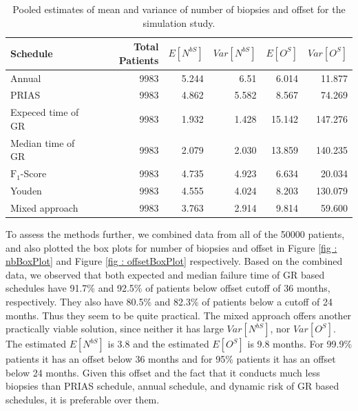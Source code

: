 \begin{table}[!htb]
\centering
\captionsetup{justification=centering}
\caption{Pooled estimates of mean and variance of number of biopsies and offset for the simulation study.}
\label{table : sim_study_pooled_estimates}
\begin{tabular}{@{}lrrrrr@{}}
\toprule
Schedule           & Total Patients & $E[N^{bS}]$ & $Var[N^{bS}]$ & $E[O^S]$ & $Var[O^S]$ \\ \midrule
Annual             & 9983           & 5.244           & 6.51           & 6.014               & 11.877             \\
PRIAS              & 9983           & 4.862           & 5.582          & 8.567               & 74.269             \\
Expeced time of GR & 9983           & 1.932           & 1.428          & 15.142              & 147.276            \\
Median time of GR  & 9983           & 2.079           & 2.030          & 13.859              & 140.235            \\
$\text{F}_1$-Score           & 9983           & 4.735           & 4.923          & 6.634               & 20.034             \\
Youden             & 9983           & 4.555           & 4.024          & 8.203               & 130.079            \\
Mixed approach     & 9983           & 3.763           & 2.914          & 9.814               & 59.600             \\ \bottomrule
\end{tabular}
\end{table}

To assess the methods further, we combined data from all of the 50000 patients, and also plotted the box plots for number of biopsies and offset in Figure \ref{fig : nbBoxPlot} and Figure \ref{fig : offsetBoxPlot} respectively. Based on the combined data, we observed that both expected and median failure time of GR based schedules have 91.7\% and 92.5\% of patients below offset cutoff of 36 months, respectively. They also have 80.5\% and 82.3\% of patients below a cutoff of 24 months. Thus they seem to be quite practical. The mixed approach offers another practically viable solution, since neither it has large $Var[N^{bS}]$, nor $Var[O^S]$. The estimated $E[N^{bS}]$ is 3.8 and the estimated $E[O^S]$ is 9.8 months. For 99.9\% patients it has an offset below 36 months and for 95\% patients it has an offset below 24 months. Given this offset and the fact that it conducts much less biopsies than PRIAS schedule, annual schedule, and dynamic risk of GR based schedules, it is preferable over them.

